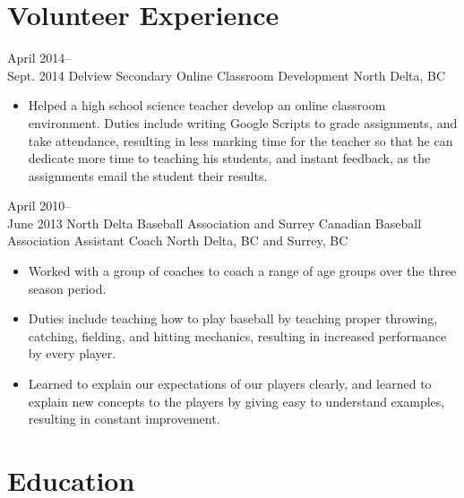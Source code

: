 \documentclass[]{friggeri-cv} %
\begin{document}
\section{Volunteer Experience}

\begin{entrylist}

\entry
{April 2014--\\Sept. 2014}
{Delview Secondary {\normalfont Online Classroom Development}}
{North Delta, BC}
{
\begin{itemize}
\item Helped a high school science teacher develop an online classroom
environment. Duties include writing Google
Scripts to grade assignments, and take attendance, resulting in less marking
time for the teacher so that he can
dedicate more time to teaching his students, and instant feedback, as the
assignments email the student their
results.
\end{itemize}
}

\newpage

\entry
{April 2010--\\June 2013}
{North Delta Baseball Association and Surrey Canadian Baseball Association {\normalfont Assistant Coach}}
{North Delta, BC and Surrey, BC}
{
\begin{itemize}
\item Worked with a group of coaches to coach a range of age groups over the
three season period.
\item Duties include teaching how to play baseball by teaching proper throwing,
catching, fielding, and hitting
mechanics, resulting in increased performance by every player.
\item Learned to explain our expectations of our players clearly, and learned to
explain new concepts to the players
by giving easy to understand examples, resulting in constant improvement.
\end{itemize}
}
\end{entrylist}


\section{Education}
\end{document}
